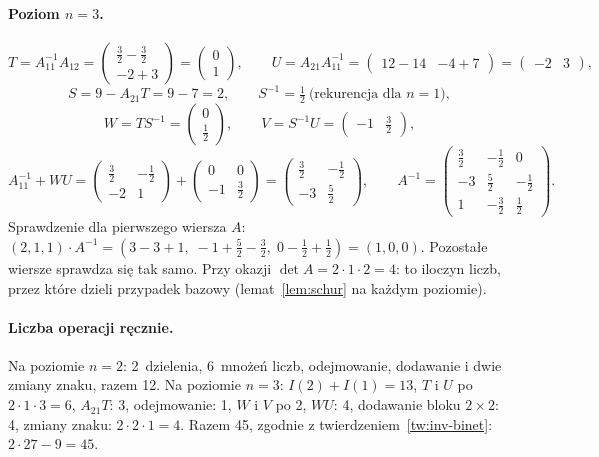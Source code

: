 \paragraph{Poziom $n=3$.}
\[
T=A_{11}^{-1}A_{12}=\begin{pmatrix}\frac32-\frac32\\-2+3\end{pmatrix}=\begin{pmatrix}0\\1\end{pmatrix},\qquad
U=A_{21}A_{11}^{-1}=\begin{pmatrix}12-14&-4+7\end{pmatrix}=\begin{pmatrix}-2&3\end{pmatrix},
\]
\[
S=9-A_{21}T=9-7=2,\qquad S^{-1}=\tfrac12\ \text{(rekurencja dla $n=1$)},
\]
\[
W=TS^{-1}=\begin{pmatrix}0\\\frac12\end{pmatrix},\qquad V=S^{-1}U=\begin{pmatrix}-1&\frac32\end{pmatrix},
\]
\[
A_{11}^{-1}+WU=\begin{pmatrix}\frac32&-\frac12\\-2&1\end{pmatrix}+\begin{pmatrix}0&0\\-1&\frac32\end{pmatrix}
=\begin{pmatrix}\frac32&-\frac12\\-3&\frac52\end{pmatrix},
\qquad
A^{-1}=\begin{pmatrix}\frac32&-\frac12&0\\[2pt]-3&\frac52&-\frac12\\[2pt]1&-\frac32&\frac12\end{pmatrix}.
\]
Sprawdzenie dla pierwszego wiersza $A$: $(2,1,1)\cdot A^{-1}=(3-3+1,\;-1+\frac52-\frac32,\;0-\frac12+\frac12)=(1,0,0)$.
Pozostałe wiersze sprawdza się tak samo. Przy okazji $\det A=2\cdot1\cdot2=4$: to iloczyn liczb, przez które dzieli
przypadek bazowy (lemat~\ref{lem:schur} na każdym poziomie).

\paragraph{Liczba operacji ręcznie.} Na poziomie $n=2$: 2~dzielenia, 6~mnożeń liczb, odejmowanie, dodawanie i dwie
zmiany znaku, razem 12. Na poziomie $n=3$: $I(2)+I(1)=13$, $T$ i $U$ po $2\cdot1\cdot3=6$, $A_{21}T$: 3,
odejmowanie: 1, $W$ i $V$ po 2, $WU$: 4, dodawanie bloku $2\times2$: 4, zmiany znaku: $2\cdot2\cdot1=4$. Razem 45, zgodnie
z twierdzeniem~\ref{tw:inv-binet}: $2\cdot27-9=45$.

